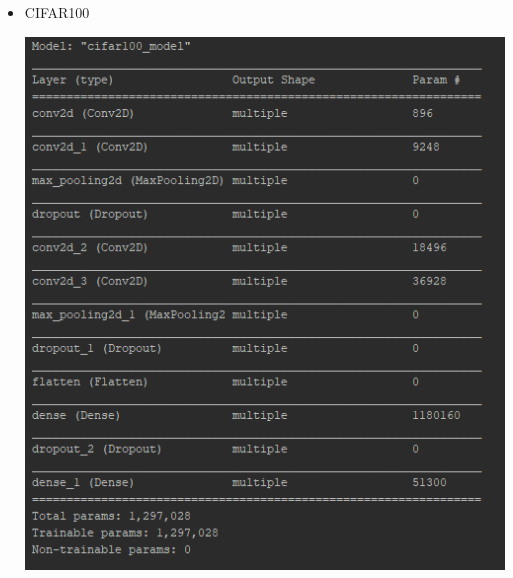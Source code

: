 \documentclass[a4paper,11pt]{article}
\begin{document}
\begin{itemize}
\begin{minipage}{\linewidth}
	\end{minipage}

	\newpage
	\item CIFAR100\par
	\begin{minipage}{\linewidth}
		\centering
		\includegraphics[width=1\linewidth]{modelCifar100}
	\end{minipage}
	\begin{minipage}{\linewidth}
		\centering

\end{minipage}
\end{itemize}
\end{document}
